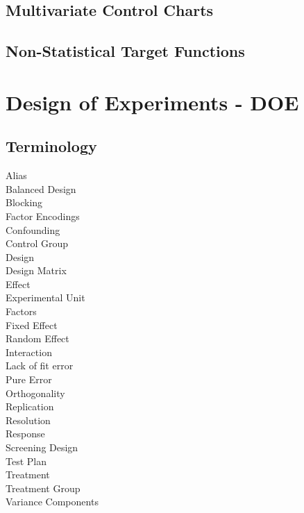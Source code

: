 \documentclass[12pt,a4paper]{report}
\begin{document}
\section{Multivariate Control Charts}


\section{Non-Statistical Target Functions}





\chapter{Design of Experiments - DOE}

\section{Terminology}
\begin{description}
\item [Alias]
\item [Balanced Design]
\item [Blocking]
\item [Factor Encodings]
\item [Confounding]
\item [Control Group]
\item [Design]
\item [Design Matrix]
\item [Effect]
\item [Experimental Unit]
\item [Factors]
\item [Fixed Effect]
\item [Random Effect]
\item [Interaction]
\item [Lack of fit error]
\item [Pure Error]
\item [Orthogonality]
\item [Replication]
\item [Resolution]
\item [Response]
\item [Screening Design]
\item [Test Plan]
\item [Treatment]
\item [Treatment Group]
\item [Variance Components]
\end{description}
\end{document}
